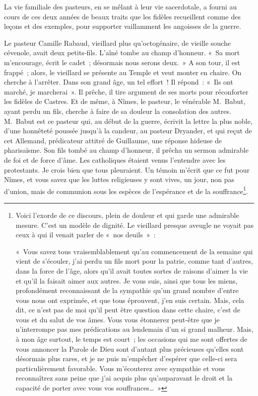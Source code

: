 \documentclass[french,twoside]{book} %
\begin{document}
La vie familiale des pasteurs, en se mêlant à leur vie sacerdotale, a fourni au cours de ces deux années de beaux traits que les fidèles recueillent comme des leçons et des exemples, pour supporter vaillamment les angoisses de la guerre.‌\par
Le pasteur Camille Rabaud, vieillard plus qu’octogénaire, de vieille souche cévenole, avait deux petits-fils. L’aîné tombe au champ d’honneur. « Sa mort m’encourage, écrit le cadet ; désormais nous serons deux. » A son tour, il est frappé ; alors, le vieillard se présente au Temple et veut monter en chaire. On cherche à l’arrêter. Dans son grand âge, un tel effort ! Il répond : « Ils ont marché, je marcherai ». Il prêche, il tire argument de ses morts pour réconforter les fidèles de Castres. Et de même, à Nîmes, le pasteur, le vénérable M. Babut, ayant perdu un fils, cherche à faire de sa douleur la consolation des autres. M. Babut est ce pasteur qui, au début de la guerre, écrivit la lettre la plus noble, d’une honnêteté poussée jusqu’à la candeur, au pasteur Dryander, et qui reçut de cet Allemand, prédicateur attitré de Guillaume, une réponse hideuse de pharisaïsme. Son fils tombé au champ d’honneur, il prêcha un sermon admirable de foi et de force d’âme. Les catholiques étaient venus l’entendre avec les protestants. Je crois bien que tous pleuraient. Un témoin m’écrit que ce fut pour Nîmes, et vous savez que les luttes religieuses y sont vives, un jour, non pas d’union, mais de communion sous les espèces de l’espérance et de la souffrance\footnote{\noindent Voici l’exorde de ce discours, plein de douleur et qui garde une admirable mesure. C’est un modèle de dignité. Le vieillard presque aveugle ne voyait pas ceux à qui il venait parler de « nos deuils » :‌\par
 « Vous savez tous vraisemblablement qu’au commencement de la semaine qui vient de s’écouler, j’ai perdu un fils mort pour la patrie, comme tant d’autres, dans la force de l’âge, alors qu’il avait toutes sortes de raisons d’aimer la vie et qu’il la faisait aimer aux autres. Je vous suis, ainsi que tous les miens, profondément reconnaissant de la sympathie qu’un grand nombre d’entre vous nous ont exprimée, et que tous éprouvent, j’en suis certain. Mais, cela dit, ce n’est pas de moi qu’il peut être question dans cette chaire, c’est de vous et du salut de vos âmes. Vous vous étonnerez peut-être que je n’interrompe pas mes prédications au lendemain d’un si grand malheur. Mais, à mon âge surtout, le temps est court ; les occasions qui me sont offertes de vous annoncer la Parole de Dieu sont d’autant plus précieuses qu’elles sont désormais plus rares, et je ne puis m’empêcher d’espérer que celle-ci sera particulièrement favorable. Vous m’écouterez avec sympathie et vous reconnaîtrez sans peine que j’ai acquis plus qu’auparavant le droit et la capacité de porter avec vous vos souffrances… »
 }.‌\par
\end{document}

